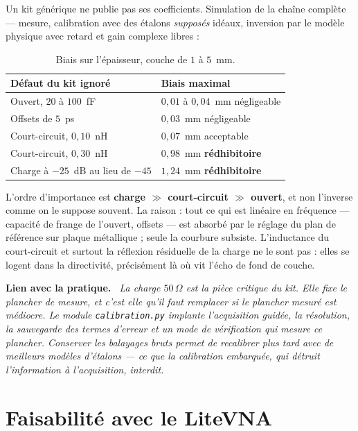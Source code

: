 \documentclass[11pt,a4paper]{article}
\newenvironment{implication}%
  {\par\medskip\begin{lrbox}{\implbox}\begin{minipage}{0.95\textwidth}%
   \textbf{Lien avec la pratique.}\itshape\ }%
  {\end{minipage}\end{lrbox}\noindent\fbox{\usebox{\implbox}}\par\medskip}
\begin{document}
Un kit générique ne publie pas ses coefficients. Simulation de la chaîne
complète --- mesure, calibration avec des étalons \emph{supposés} idéaux,
inversion par le modèle physique avec retard et gain complexe libres :

\begin{table}[h]
\centering
\caption{Biais sur l'épaisseur, couche de $1$ à $5$~mm.}
\begin{tabular}{ll}
\toprule
Défaut du kit ignoré & Biais maximal \\
\midrule
Ouvert, $20$ à $100$~fF        & $0{,}01$ à $0{,}04$~mm \quad négligeable \\
Offsets de $5$~ps              & $0{,}03$~mm \quad négligeable \\
Court-circuit, $0{,}10$~nH     & $0{,}07$~mm \quad acceptable \\
Court-circuit, $0{,}30$~nH     & $0{,}98$~mm \quad \textbf{rédhibitoire} \\
Charge à $-25$~dB au lieu de $-45$ & $1{,}24$~mm \quad \textbf{rédhibitoire} \\
\bottomrule
\end{tabular}
\end{table}

L'ordre d'importance est \textbf{charge $\gg$ court-circuit $\gg$ ouvert}, et
non l'inverse comme on le suppose souvent. La raison : tout ce qui est linéaire
en fréquence --- capacité de frange de l'ouvert, offsets --- est absorbé par le
réglage du plan de référence sur plaque métallique ; seule la courbure subsiste.
L'inductance du court-circuit et surtout la réflexion résiduelle de la charge ne
le sont pas : elles se logent dans la directivité, précisément là où vit l'écho
de fond de couche.

\begin{implication}
La charge $50\,\Omega$ est la pièce critique du kit. Elle fixe le plancher de
mesure, et c'est elle qu'il faut remplacer si le plancher mesuré est médiocre.
Le module \texttt{calibration.py} implante l'acquisition guidée, la
résolution, la sauvegarde des termes d'erreur et un mode de vérification qui
mesure ce plancher. Conserver les balayages bruts permet de recalibrer plus tard
avec de meilleurs modèles d'étalons --- ce que la calibration embarquée, qui
détruit l'information à l'acquisition, interdit.
\end{implication}

\section{Faisabilité avec le LiteVNA}
\end{document}
